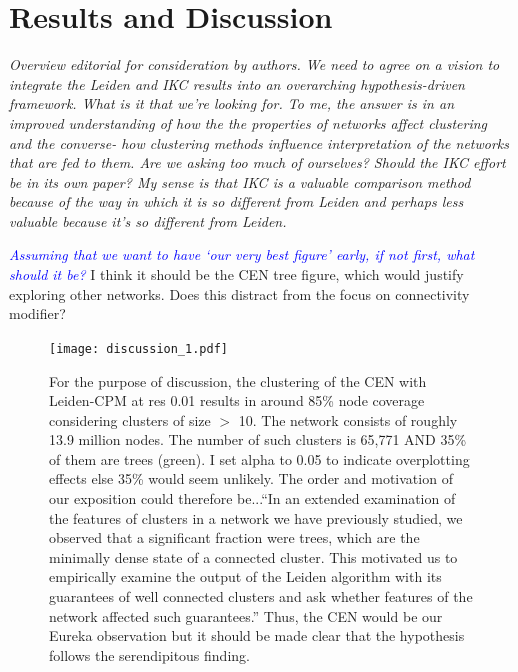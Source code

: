 \documentclass[12pt, oneside]{article}   	%
\begin{document}
\section{Results and Discussion}

\emph{Overview editorial for consideration by authors. We need to agree on a vision to integrate the Leiden and IKC results into an overarching hypothesis-driven framework. What is it that we're looking for. To me, the answer is in an improved understanding of how the the properties of networks affect clustering and the converse- how clustering methods influence interpretation of the networks that are fed to them. Are we asking too much of ourselves? Should the IKC effort be in its own paper? My sense is that IKC is a valuable comparison method because of the way in which it is so different from Leiden and perhaps less valuable because it's so different from Leiden.}

\textcolor{blue}{\emph{Assuming that we want to have `our very best figure' early, if not first, what should it be?}} I think it should be the CEN tree figure, which would justify exploring other networks.  Does this distract from the focus on connectivity modifier?

\begin{figure}[H]
\centering
\texttt{[image: discussion\_1.pdf]}
\caption{For the purpose of discussion, the clustering of the CEN with Leiden-CPM at res 0.01 results in around 85\% node coverage considering clusters of size $>$ 10. The network consists of roughly 13.9 million nodes. The number of such clusters is 65,771 AND 35\% of them are trees (green). I set alpha to 0.05 to indicate overplotting effects else 35\% would seem unlikely. The order and motivation of our exposition could therefore be...``In an extended examination of the features of clusters in a network we have previously studied, we observed that a significant fraction were trees, which are the minimally dense state of a connected cluster. This motivated us to empirically examine the output of the Leiden algorithm with its guarantees of well connected clusters and ask whether features of the network affected such guarantees.'' Thus, the CEN would be our Eureka observation but it should be made clear that the hypothesis follows the serendipitous finding.}
\end{figure}
\end{document}
